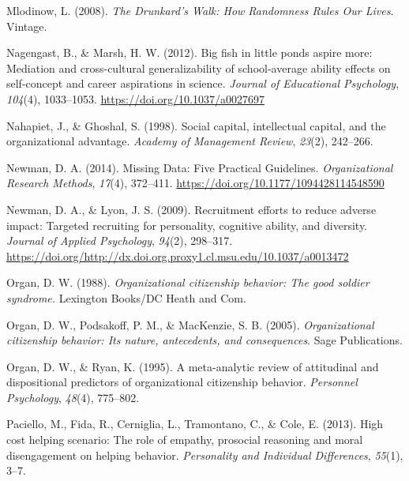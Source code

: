 \documentclass[english,,man]{apa6}
\begin{document}
\leavevmode\hypertarget{ref-mlodinow_drunkards_2008}{}%
Mlodinow, L. (2008). \emph{The Drunkard's Walk: How Randomness Rules Our Lives}. Vintage.

\leavevmode\hypertarget{ref-nagengast_big_2012}{}%
Nagengast, B., \& Marsh, H. W. (2012). Big fish in little ponds aspire more: Mediation and cross-cultural generalizability of school-average ability effects on self-concept and career aspirations in science. \emph{Journal of Educational Psychology}, \emph{104}(4), 1033--1053. \url{https://doi.org/10.1037/a0027697}

\leavevmode\hypertarget{ref-nahapiet_social_1998}{}%
Nahapiet, J., \& Ghoshal, S. (1998). Social capital, intellectual capital, and the organizational advantage. \emph{Academy of Management Review}, \emph{23}(2), 242--266.

\leavevmode\hypertarget{ref-newman_missing_2014}{}%
Newman, D. A. (2014). Missing Data: Five Practical Guidelines. \emph{Organizational Research Methods}, \emph{17}(4), 372--411. \url{https://doi.org/10.1177/1094428114548590}

\leavevmode\hypertarget{ref-newman_recruitment_2009}{}%
Newman, D. A., \& Lyon, J. S. (2009). Recruitment efforts to reduce adverse impact: Targeted recruiting for personality, cognitive ability, and diversity. \emph{Journal of Applied Psychology}, \emph{94}(2), 298--317. \url{https://doi.org/http://dx.doi.org.proxy1.cl.msu.edu/10.1037/a0013472}

\leavevmode\hypertarget{ref-organ_organizational_1988}{}%
Organ, D. W. (1988). \emph{Organizational citizenship behavior: The good soldier syndrome.} Lexington Books/DC Heath and Com.

\leavevmode\hypertarget{ref-organ_organizational_2005}{}%
Organ, D. W., Podsakoff, P. M., \& MacKenzie, S. B. (2005). \emph{Organizational citizenship behavior: Its nature, antecedents, and consequences}. Sage Publications.

\leavevmode\hypertarget{ref-organ_meta-analytic_1995}{}%
Organ, D. W., \& Ryan, K. (1995). A meta-analytic review of attitudinal and dispositional predictors of organizational citizenship behavior. \emph{Personnel Psychology}, \emph{48}(4), 775--802.

\leavevmode\hypertarget{ref-paciello_high_2013}{}%
Paciello, M., Fida, R., Cerniglia, L., Tramontano, C., \& Cole, E. (2013). High cost helping scenario: The role of empathy, prosocial reasoning and moral disengagement on helping behavior. \emph{Personality and Individual Differences}, \emph{55}(1), 3--7.
\end{document}
